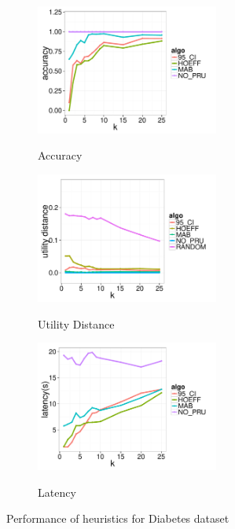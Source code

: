 \begin{figure}[t]
	\centering
	\begin{subfigure}{0.33\linewidth}
		\centering
		{\includegraphics[width=6cm] {Images/in_memory_dia_accuracy.pdf}}
		\caption{Accuracy}
		\label{fig:dia_accuracy}
	\end{subfigure}
	\begin{subfigure}{0.33\linewidth}
		\centering
		{\includegraphics[width=6cm] {Images/in_memory_dia_utility_dist.pdf}}
		\caption{Utility Distance}
		\label{fig:dia_utility_dist}
	\end{subfigure}
	\begin{subfigure}{0.33\linewidth}
		\centering
		{\includegraphics[width=6cm] {Images/in_memory_dia_latency.pdf}}
		\caption{Latency}
		\label{fig:diabetes_latency}
	\end{subfigure}
	\caption{Performance of heuristics for Diabetes dataset}
	\label{fig:diabetes_perf}
\end{figure}



